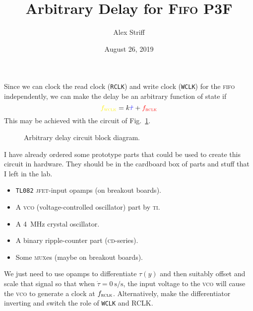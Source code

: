 \documentclass[11pt,letterpaper]{article}
\title{Arbitrary Delay for \textsc{Fifo} P3F}
\author{Alex Striff}
\date{August 26, 2019}
\begin{document}
\maketitle

Since we can clock the read clock (\texttt{RCLK}) and write clock
(\texttt{WCLK}) for the \textsc{fifo} independently, we can make the delay be an
arbitrary function of state if
\[
  \textcolor{yellow}{f_\textsc{wclk}}
  = k\textcolor{blue}{\dot{\tau}} + \textcolor{red}{f_\textsc{rclk}}
\]
This may be achieved with the circuit of Fig.~\ref{fig:arb}.

\begin{figure}
  \centering
  \caption{Arbitrary delay circuit block diagram.}
  \label{fig:arb}
\end{figure}

I have already ordered some prototype parts that could be used to create this
circuit in hardware. They should be in the cardboard box of parts and stuff that
I left in the lab.

\begin{itemize}
  \item \texttt{TL082} \textsc{jfet}-input opamps (on breakout boards).
  \item A \textsc{vco} (voltage-controlled oscillator) part by \textsc{ti}.
  \item A \SI{4}{\MHz} crystal oscillator.
  \item A binary ripple-counter part (\textsc{cd}-series).
  \item Some \textsc{mux}es (maybe on breakout boards).
\end{itemize}

We just need to use opamps to differentiate $\tau(y)$ and then suitably offset
and scale that signal so that when $\dot{\tau} = \SI{0}{\s\per\s}$, the
input voltage to the \textsc{vco} will cause the \textsc{vco} to generate
a clock at $f_\textsc{rclk}$. Alternatively, make the differentiator inverting
and switch the role of \texttt{WCLK} and \textsc{RCLK}.
\end{document}
